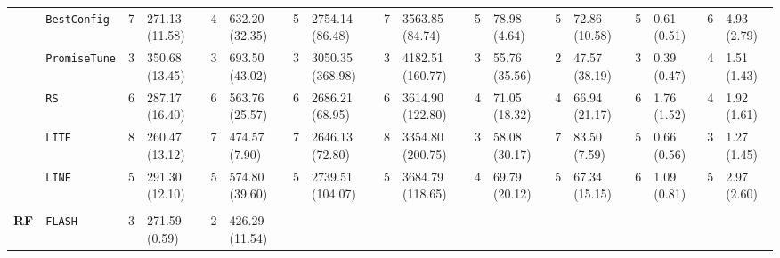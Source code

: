 \begin{tabular}{clllllllllllllllll}
\multicolumn{1}{c|}{} &
  \multicolumn{1}{l|}{\texttt{BestConfig}} &
  7 &
  \multicolumn{1}{l|}{271.13 (11.58)} &
  4 &
  \multicolumn{1}{l|}{632.20 (32.35)} &
  5 &
  \multicolumn{1}{l|}{2754.14 (86.48)} &
  7 &
  \multicolumn{1}{l|}{3563.85 (84.74)} &
  5 &
  \multicolumn{1}{l|}{78.98 (4.64)} &
  5 &
  \multicolumn{1}{l|}{72.86 (10.58)} &
  5 &
  \multicolumn{1}{l|}{0.61 (0.51)} &
  6 &
  4.93 (2.79) \\
\multicolumn{1}{c|}{} &
  \multicolumn{1}{l|}{\texttt{PromiseTune}} &
  3 &
  \multicolumn{1}{l|}{350.68 (13.45)} &
  3 &
  \multicolumn{1}{l|}{693.50 (43.02)} &
  3 &
  \multicolumn{1}{l|}{3050.35 (368.98)} &
  3 &
  \multicolumn{1}{l|}{4182.51 (160.77)} &
  3 &
  \multicolumn{1}{l|}{55.76 (35.56)} &
  2 &
  \multicolumn{1}{l|}{47.57 (38.19)} &
  3 &
  \multicolumn{1}{l|}{0.39 (0.47)} &
  4 &
  1.51 (1.43) \\
\multicolumn{1}{c|}{} &
  \multicolumn{1}{l|}{\texttt{RS}} &
  6 &
  \multicolumn{1}{l|}{287.17 (16.40)} &
  6 &
  \multicolumn{1}{l|}{563.76 (25.57)} &
  6 &
  \multicolumn{1}{l|}{2686.21 (68.95)} &
  6 &
  \multicolumn{1}{l|}{3614.90 (122.80)} &
  4 &
  \multicolumn{1}{l|}{71.05 (18.32)} &
  4 &
  \multicolumn{1}{l|}{66.94 (21.17)} &
  6 &
  \multicolumn{1}{l|}{1.76 (1.52)} &
  4 &
  1.92 (1.61) \\
\multicolumn{1}{c|}{} &
  \multicolumn{1}{l|}{\texttt{LITE}} &
  8 &
  \multicolumn{1}{l|}{260.47 (13.12)} &
  7 &
  \multicolumn{1}{l|}{474.57 (7.90)} &
  7 &
  \multicolumn{1}{l|}{2646.13 (72.80)} &
  8 &
  \multicolumn{1}{l|}{3354.80 (200.75)} &
  3 &
  \multicolumn{1}{l|}{58.08 (30.17)} &
  7 &
  \multicolumn{1}{l|}{83.50 (7.59)} &
  5 &
  \multicolumn{1}{l|}{0.66 (0.56)} &
  3 &
  1.27 (1.45) \\
\multicolumn{1}{c|}{} &
  \multicolumn{1}{l|}{\texttt{LINE}} &
  5 &
  \multicolumn{1}{l|}{291.30 (12.10)} &
  5 &
  \multicolumn{1}{l|}{574.80 (39.60)} &
  5 &
  \multicolumn{1}{l|}{2739.51 (104.07)} &
  5 &
  \multicolumn{1}{l|}{3684.79 (118.65)} &
  4 &
  \multicolumn{1}{l|}{69.79 (20.12)} &
  5 &
  \multicolumn{1}{l|}{67.34 (15.15)} &
  6 &
  \multicolumn{1}{l|}{1.09 (0.81)} &
  5 &
  2.97 (2.60) \\
\hline
\multicolumn{1}{l}{\textbf{}} &
    &
    &
    &
    &
    &
    &
    &
    &
    &
    &
    &
    &
    &
    &
    &
    &
    \\ \hline
\multicolumn{1}{c|}{\multirow{9}{*}{\textbf{RF}}} &
  \multicolumn{1}{l|}{\texttt{FLASH}} &
  3 &
  \multicolumn{1}{l|}{271.59 (0.59)} &
  2 &
  \multicolumn{1}{l|}{426.29 (11.54)} &

\end{tabular}
